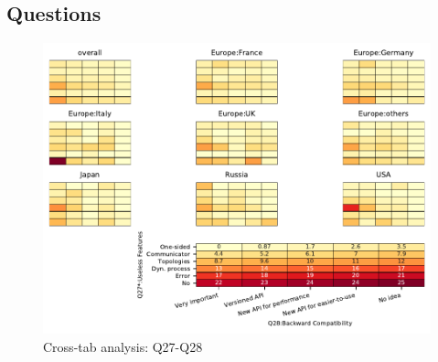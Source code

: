 
\subsection{Questions}


\begin{figure}
\begin{center}
\includegraphics[width=12cm]{../pdfs/Q27-Q28.pdf}
\caption{Cross-tab analysis: Q27-Q28}
\label{fig:Q27-Q28}
\end{center}
\end{figure}
